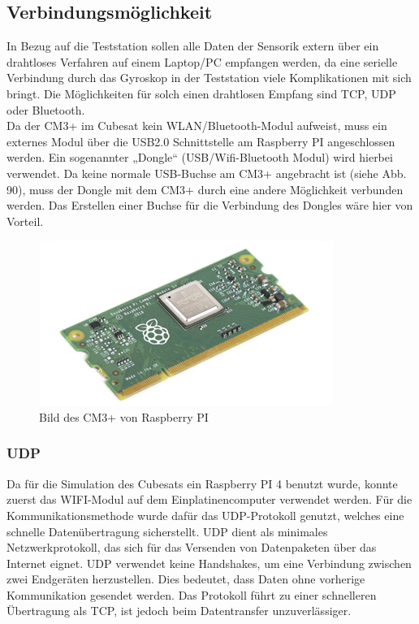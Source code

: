 \subsection{Verbindungsmöglichkeit }\label{Verbindung}
\SecAuth{\nameCZ}
In Bezug auf die Teststation sollen alle Daten der Sensorik extern über ein drahtloses Verfahren auf einem Laptop/PC empfangen werden, da eine serielle Verbindung durch das Gyroskop in der Teststation viele Komplikationen mit sich bringt. Die Möglichkeiten für solch einen drahtlosen Empfang sind TCP, UDP oder Bluetooth. \\
\vspace{3mm}
Da der CM3+ im Cubesat kein WLAN/Bluetooth-Modul aufweist, muss ein externes Modul über die USB2.0 Schnittstelle am Raspberry PI angeschlossen werden. Ein sogenannter „Dongle“ (USB/Wifi-Bluetooth Modul) wird hierbei verwendet. Da keine normale USB-Buchse am CM3+ angebracht ist (siehe Abb. 90), muss der Dongle mit dem CM3+ durch eine andere Möglichkeit verbunden werden. Das Erstellen einer Buchse für die Verbindung des Dongles wäre hier von Vorteil. \\
\vspace{3mm}
\begin{figure}[H]
	\centering
	\includegraphics[scale=0.8]{image/cm3+.png}
	\caption{Bild des CM3+ von Raspberry PI}
\end{figure}
\vspace{3mm}
\subsubsection{UDP}\label{udp}
Da für die Simulation des Cubesats ein Raspberry PI 4 benutzt wurde, konnte zuerst das WIFI-Modul auf dem Einplatinencomputer verwendet werden. Für die Kommunikationsmethode wurde dafür das UDP-Protokoll genutzt, welches eine schnelle Datenübertragung sicherstellt. UDP\autocite{UDP} dient als minimales Netzwerkprotokoll, das sich für das Versenden von Datenpaketen über das Internet eignet. UDP verwendet keine Handshakes, um eine Verbindung zwischen zwei Endgeräten herzustellen. Dies bedeutet, dass Daten ohne vorherige Kommunikation gesendet werden. Das Protokoll führt zu einer schnelleren Übertragung als TCP, ist jedoch beim Datentransfer unzuverlässiger.

